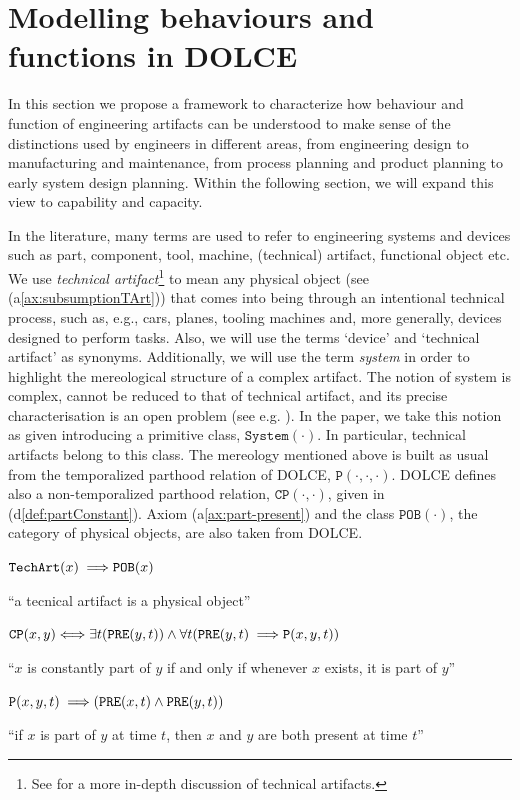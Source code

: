 \documentclass[sw]{iosart2x}
\newcommand{\bflist}{\begin{list}{}{\setlength{\topsep}{2mm}\setlength{\partopsep}{0mm}\setlength{\parsep}{0mm}\setlength{\leftmargin}{9mm}\setlength{\labelwidth}{8mm}}}
\newcommand{\eflist}{\end{list}}
\newcommand{\AxLabel}{\textrm{a}}
\newcommand{\DefLabel}{\textrm{d}}
\newcounter{cntax}
\newcommand{\myax}[1]{\refstepcounter{cntax}\begin{small}{\bf \AxLabel\thecntax\label{ax:#1}}\end{small}}
\newcounter{cntdef}
\newcommand{\mydf}[1]{\refstepcounter{cntdef}\begin{small}{\bf \DefLabel\thecntdef\label{def:#1}}\end{small}}
\newcommand{\mytext}[1]{``#1''}
\newcommand{\refax}[1]{({\AxLabel}\ref{#1})}
\newcommand{\refdf}[1]{({\DefLabel}\ref{#1})}
\newcommand{\generalStyle}[1]{\texttt{#1}}
\newcommand{\biRel}[3]{\generalStyle{#1}(#2,#3)}
\newcommand{\uniRel}[2]{\generalStyle{#1}(#2)}
\newcommand{\triRel}[4]{\generalStyle{#1}(#2,#3,#4)}
\newcommand{\myiff}{\Longleftrightarrow}
\newcommand{\myfi}{\hspace{0.9mm} \Longrightarrow}
\newcommand{\DOLCE}{\textsc{DOLCE}\xspace} %
\newcommand{\DOLCEPhysObj}[1]{\uniRel{{POB}}{#1}}
\newcommand{\DOLCEPartBin}[2]{\biRel{{CP}}{#1}{#2}}
\newcommand{\DOLCEPart}[3]{\triRel{{P}}{#1}{#2}{#3}}
\newcommand{\DOLCEPRE}[2]{\biRel{PRE}{#1}{#2}}
\newcommand{\TechArt}[1]{\uniRel{TechArt}{#1}}
\newcommand{\System}[1]{\uniRel{System}{#1}}
\newcommand{\firstTimeKeyWord}[1]{\textit{#1}}
\newcommand{\quotes}[1]{`#1'}
\begin{document}
\section{Modelling behaviours and functions in \DOLCE \label{sec:capabilitiesEtc}}
In this section we propose a framework to characterize how behaviour and function of engineering artifacts can be understood to make sense of the distinctions used by engineers in different areas, from engineering design to manufacturing and maintenance, from process planning and product planning to early system design planning. Within the following section, we will expand this view to capability and capacity.

In the literature, many terms are used to refer to engineering systems and devices such as part, component, tool, machine, (technical) artifact, functional object etc. 
We use \firstTimeKeyWord{technical artifact}\footnote{See \cite{borgoTechnicalArtifactsIntegrated2017} for a more in-depth discussion of technical artifacts.} to mean any physical object (see \refax{ax:subsumptionTArt}) that comes into being through an intentional technical process, such as, e.g., cars, planes, tooling machines and, more generally, devices designed to perform tasks. Also, we will use the terms \quotes{device} and \quotes{technical artifact} as synonyms. 
Additionally, we will use the term \firstTimeKeyWord{system} in order to highlight the mereological structure of a complex artifact. 
The notion of system is complex, cannot be reduced to  that of technical artifact, and its precise characterisation is an open problem (see e.g. \cite{mizoguchiRoleSystemicView2021}). In the paper, we take this notion as given introducing a primitive class, $\System{\cdot}$. In particular, technical artifacts belong to this class. 
The mereology mentioned above is built as usual from the temporalized parthood relation of \DOLCE,  $\DOLCEPart{\cdot}{\cdot}{\cdot}$. \DOLCE defines also a non-temporalized parthood relation, $\DOLCEPartBin{\cdot}{\cdot}$, given in \refdf{def:partConstant}. Axiom \refax{ax:part-present} and the class $\DOLCEPhysObj{\cdot}$, the category of physical objects, are also taken from \DOLCE.
\bflist
\item[\myax{subsumptionTArt}] $ \TechArt{x} \myfi \DOLCEPhysObj{x}$
\item \mytext{a tecnical artifact is a physical object}
\item[\mydf{partConstant}] $ \DOLCEPartBin{x}{y}  \myiff \exists t (\DOLCEPRE{y}{t}) \land \forall t (\DOLCEPRE{y}{t} \myfi \DOLCEPart{x}{y}{t})$
\item \mytext{$x$ is constantly part of $y$ if and only if whenever $x$ exists, it is part of $y$}
\item[\myax{part-present}] $ \DOLCEPart{x}{y}{t} \myfi (\DOLCEPRE{x}{t} \land \DOLCEPRE{y}{t})$
\item \mytext{if $x$ is part of $y$ at time $t$, then $x$ and $y$ are both present at time $t$}
\eflist
\end{document}

